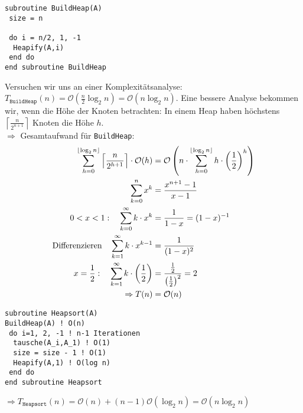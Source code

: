 \begin{lstlisting}
subroutine BuildHeap(A)
 size = n
 
 do i = n/2, 1, -1
  Heapify(A,i)
 end do
end subroutine BuildHeap
\end{lstlisting}

Versuchen wir uns an einer Komplexitätsanalyse: $T_\texttt{BuildHeap}(n) = \mathcal{O}\left(\frac{n}{2}\log_2 n\right) = \mathcal{O}(n\log_2 n)$. Eine bessere Analyse bekommen wir, wenn die Höhe der Knoten betrachten: In einem Heap haben höchstens $\left\lceil\frac{n}{2^{n+1}}\right\rceil$ Knoten die Höhe $h$. \\
$\Rightarrow$ Gesamtaufwand für \texttt{BuildHeap}:
\begin{align}
	\sum_{h=0}^{\lfloor\log_2 n\rfloor}\left\lceil\frac{n}{2^{h+1}}\right\rceil\cdot\mathcal{O}(h) &= \mathcal{O}\left( n\cdot\sum_{h=0}^{\lfloor\log_2 n\rfloor} h\cdot \left( \frac{1}{2}\right)^h\right) \notag \\
	\sum_{k=0}^n x^k &= \frac{x^{n+1}-1}{x-1} \notag \\
	0<x<1: \quad \sum_{k=0}^\infty k\cdot x^k &= \frac{1}{1-x}=(1-x)^{-1} \notag \\
	\text{Differenzieren} \quad \sum_{k=1}^\infty k\cdot x^{k-1}&=\frac{1}{(1-x)^2} \notag \\
	x=\frac{1}{2}:\quad \sum_{k=1}^\infty k\cdot \left(\frac{1}{2}\right) &= \frac{\frac{1}{2}}{\left( \frac{1}{2}\right)^2}=2 \notag \\
	\Rightarrow T(n) &= \mathcal{O}(n)\notag
\end{align}

\begin{lstlisting}
subroutine Heapsort(A)
BuildHeap(A) ! O(n)
 do i=1, 2, -1 ! n-1 Iterationen
  tausche(A_i,A_1) ! O(1)
  size = size - 1 ! O(1)
  Heapify(A,1) ! O(log n)
 end do
end subroutine Heapsort
\end{lstlisting}
$\Rightarrow T_\texttt{Heapsort}(n)=\mathcal{O}(n)+(n-1)\mathcal{O}(\log_2 n)=\mathcal{O}(n\log_2 n)$